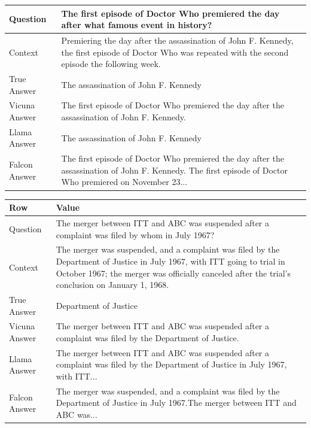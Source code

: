\documentclass[a4paper,12pt]{article}
\begin{document}
    \begin{table}[htbp]
        \centering
        \begin{tabular}{|p{3cm}|p{7cm}|}
        \hline
        Question & The first episode of Doctor Who premiered the day after what famous event in history? \\
        \hline
        Context & Premiering the day after the assassination of John F. Kennedy, the first episode of Doctor Who was repeated with the second episode the following week. \\
        \hline
        True Answer & The assassination of John F. Kennedy \\
        \hline
        Vicuna Answer & The first episode of Doctor Who premiered the day after the assassination of John F. Kennedy. \\
        \hline
        Llama Answer & The assassination of John F. Kennedy \\
        \hline
        Falcon Answer & The first episode of Doctor Who premiered the day after the assassination of John F. Kennedy.
        The first episode of Doctor Who premiered on November 23... \\
        \hline
        \end{tabular}
    \end{table}
    
    \begin{table}[htbp]
        \centering
        \begin{tabular}{|p{3cm}|p{7cm}|}
        \hline
        \textbf{Row} & \textbf{Value} \\
        \hline
        Question & The merger between ITT and ABC was suspended after a complaint was filed by whom in July 1967? \\
        \hline
        Context & The merger was suspended, and a complaint was filed by the Department of Justice in July 1967, with ITT going to trial in October 1967; the merger was officially canceled after the trial's conclusion on January 1, 1968. \\
        \hline
        True Answer & Department of Justice \\
        \hline
        Vicuna Answer & The merger between ITT and ABC was suspended after a complaint was filed by the Department of Justice. \\
        \hline
        Llama Answer & The merger between ITT and ABC was suspended after a complaint was filed by the Department of Justice in July 1967, with ITT... \\
        \hline
        Falcon Answer & The merger was suspended, and a complaint was filed by the Department of Justice in July 1967.The merger between ITT and ABC was... \\
        \hline
        \end{tabular}
        \end{table}
        

\begin{lstlisting}[language=Python]
\end{lstlisting}
\end{document}
